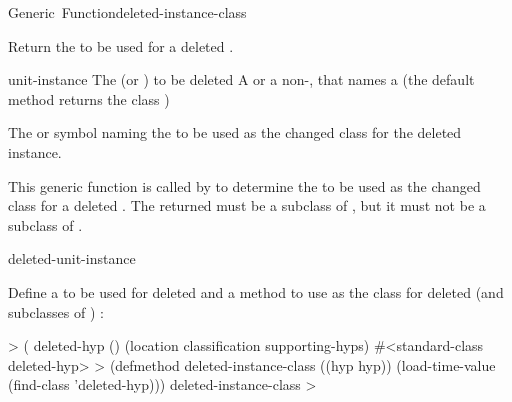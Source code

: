 \documentclass[10pt,twoside,english,pdftex]{article}
\begin{document}
\begin{functiondoc}{Generic~Function}{deleted-instance-class}%
  {
    \returns{} }
%
%

\fnsyntax

\fnpurpose Return the  to be used for a deleted
.

\fnmethods
{}%
  {\code{(} 
    \returns{} }

\fnpackage {}

\fnmodule {}

\fnargs
\begin{args}{unit-instance}
 The  (or ) to
  be deleted
\arg[class] A  or a non-\nil,  that
names a  (the default method returns the class
)
\end{args}

\fnreturns The  or symbol naming the  to be used as
the changed class for the deleted instance.

\fndescription This generic function is called by
 to determine the  to be
used as the changed class for a deleted .  The returned
 must be a subclass of
, but it must not be a subclass
of .

\begin{alsos}{deleted-unit-instance}
\end{alsos}

\fnexample 
{}%
%
%
Define a  to be used for deleted 
 and a  method to
use  as the class for deleted  (and
subclasses of ) :
%
\W\supp
\begin{example}
  > ( deleted-hyp ()
      (location
       classification
       supporting-hyps)
  #<standard-class deleted-hyp>
  > (defmethod deleted-instance-class ((hyp hyp))
      (load-time-value (find-class 'deleted-hyp)))
  deleted-instance-class
  >
\end{example}

\end{functiondoc}
\end{document}
